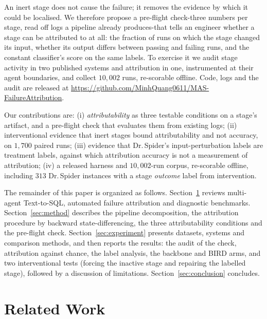 \documentclass{llncs}
\begin{document}
An inert stage does not cause the failure; it removes the evidence by which
it could be localised. We therefore propose a pre-flight check-three numbers
per stage, read off logs a pipeline already produces-that tells an engineer
whether a stage can be attributed to at all: the fraction of runs on which
the stage changed its input, whether its output differs between passing and
failing runs, and the constant classifier's score on the same labels. To
exercise it we audit stage activity in two published systems and attribution
in one, instrumented at their agent boundaries, and collect $10{,}002$ runs,
re-scorable offline. Code, logs and the audit are released at
\url{https://github.com/MinhQuang0611/MAS-FailureAttribution}.

Our contributions are: (i) \emph{attributability} as three testable
conditions on a stage's artifact, and a pre-flight check that evaluates them
from existing logs; (ii) interventional evidence that inert stages bound
attributability and not accuracy, on $1{,}700$ paired runs; (iii) evidence
that Dr.\,Spider's input-perturbation labels are treatment labels, against
which attribution accuracy is not a measurement of attribution; (iv) a released
harness and $10{,}002$-run corpus, re-scorable offline, including $313$
Dr.\,Spider instances with a stage \emph{outcome} label from intervention.

The remainder of this paper is organized as follows.
Section~\ref{sec:related} reviews multi-agent Text-to-SQL, automated failure attribution and diagnostic benchmarks. Section~\ref{sec:method} describes the pipeline decomposition, the attribution procedure by backward state-differencing, the three attributability conditions and the pre-flight check. Section~\ref{sec:experiment} presents datasets, systems and comparison methods, and then reports the results: the audit of the check, attribution against chance, the label analysis, the backbone and BIRD arms, and two interventional tests (forcing the inactive stage and repairing the labelled stage), followed by a discussion of limitations. Section~\ref{sec:conclusion} concludes.

\section{Related Work}
\label{sec:related}
\end{document}
